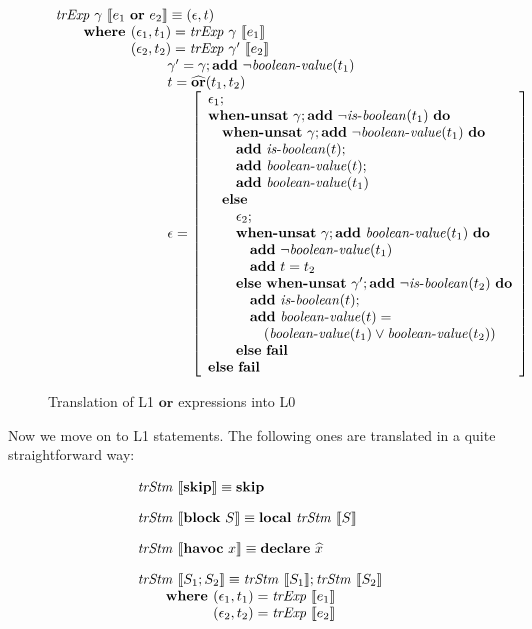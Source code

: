 \begin{figure}
\[
\begin{array}{l}
\trExp{\gamma}{\orE{e_1}{e_2}} \equiv (\epsilon, t)\\
\qquad \textbf{where }(\epsilon_1, t_1) = \trExp{\gamma}{e_1}\\
\qquad \phantom{\textbf{where }}(\epsilon_2, t_2) = \trExp{\gamma'}{e_2}\\
\qquad\qquad\qquad\qquad \gamma' = \gamma;\addE~\neg\booleanvalue{t_1}\\
\qquad\qquad\qquad\qquad t = \widehat{\mathbf{or}}(t_1, t_2)\\
\qquad\qquad\qquad\qquad \epsilon = \left[ 
\begin{array}{l}
\epsilon_1;\\
\whenUnsatW~\gamma;\addE~\neg\isboolean{t_1}~\doW\\
\quad\whenUnsatW~\gamma;\addE~\neg\booleanvalue{t_1}~\doW\\
\quad\quad\addE~\isboolean{t};\\
\quad\quad\addE~\booleanvalue{t};\\
\quad\quad\addE~\booleanvalue{t_1}\\
\quad\elseW\\
\quad\quad\epsilon_2;\\
\quad\quad\whenUnsatW~\gamma;\addE~\booleanvalue{t_1}~\doW\\
\quad\quad\quad\addE~\neg\booleanvalue{t_1}\\
\quad\quad\quad\addE~t = t_2\\
\quad\quad\elseW~\whenUnsatW~\gamma';\addE~\neg\isboolean{t_2}~\doW\\
\quad\quad\quad\addE~\isboolean{t};\\
\quad\quad\quad\addE~\booleanvalue{t} = \\
\quad\quad\quad\quad(\booleanvalue{t_1} \lor \booleanvalue{t_2})\\
\quad\quad\elseW~\failE\\
\elseW~\failE
\end{array}
\right] \\
\end{array}
\]
\caption{Translation of L1 $\mathbf{or}$ expressions into L0}
\label{fig:ortr}
\end{figure}

Now we move on to L1 statements. The following ones are translated in a 
quite straightforward way:

\[
\begin{array}{l}
\trStm{\skipE} \equiv \skipE\\[1em]
\trStm{\blockE~S} \equiv \localE~\trStm{S}\\[1em]
\trStm{\havocE~x} \equiv \declareE{\widehat{x}}\\[1em]
\trStm{S_1;S_2} \equiv \trStm{S_1};\trStm{S_2}\\
\qquad \textbf{where }(\epsilon_1, t_1) = \trExps{e_1}\\
\qquad \phantom{\textbf{where }}(\epsilon_2, t_2) = \trExps{e_2}
\end{array}
\]

